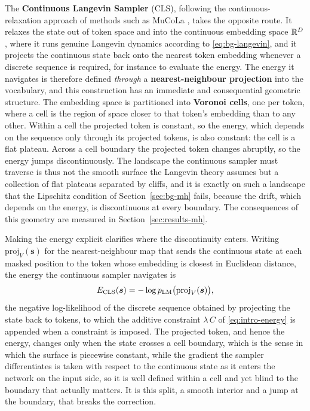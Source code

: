 The \textbf{Continuous Langevin Sampler} (CLS), following the continuous-relaxation approach of methods such as MuCoLa \citep{kumar2022gradient}, takes the opposite route. It relaxes the state out of token space and into the continuous embedding space $\mathbb{R}^D$, where it runs genuine Langevin dynamics according to \eqref{eq:bg-langevin}, and it projects the continuous state back onto the nearest token embedding whenever a discrete sequence is required, for instance to evaluate the energy. The energy it navigates is therefore defined \emph{through} a \textbf{nearest-neighbour projection} into the vocabulary, and this construction has an immediate and consequential geometric structure. The embedding space is partitioned into \textbf{Voronoi cells}, one per token, where a cell is the region of space closer to that token's embedding than to any other. Within a cell the projected token is constant, so the energy, which depends on the sequence only through its projected tokens, is also constant: the cell is a flat plateau. Across a cell boundary the projected token changes abruptly, so the energy jumps discontinuously. The landscape the continuous sampler must traverse is thus not the smooth surface the Langevin theory assumes but a collection of flat plateaus separated by cliffs, and it is exactly on such a landscape that the Lipschitz condition of Section~\ref{sec:bg-mh} fails, because the drift, which depends on the energy, is discontinuous at every boundary. The consequences of this geometry are measured in Section~\ref{sec:results-mh}.

Making the energy explicit clarifies where the discontinuity enters. Writing $\mathrm{proj}_V(\bm{s})$ for the nearest-neighbour map that sends the continuous state at each masked position to the token whose embedding is closest in Euclidean distance, the energy the continuous sampler navigates is
\begin{equation}
    E_{\text{CLS}}(\bm{s}) = -\log p_{\text{LM}}\bigl(\mathrm{proj}_V(\bm{s})\bigr),
    \label{eq:bg-cls-energy}
\end{equation}
the negative log-likelihood of the discrete sequence obtained by projecting the state back to tokens, to which the additive constraint $\lambda\, C$ of \eqref{eq:intro-energy} is appended when a constraint is imposed.
The projected token, and hence the energy, changes only when the state crosses a cell boundary, which is the sense in which the surface is piecewise constant, while the gradient the sampler differentiates is taken with respect to the continuous state as it enters the network on the input side, so it is well defined within a cell and yet blind to the boundary that actually matters. It is this split, a smooth interior and a jump at the boundary, that breaks the correction.

